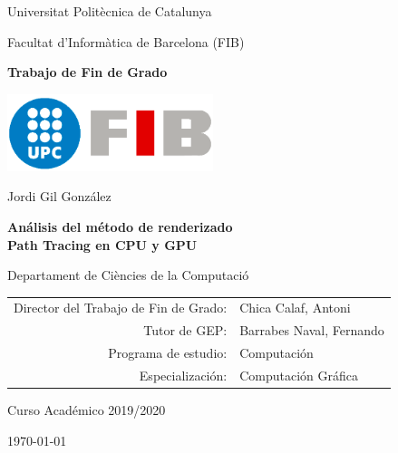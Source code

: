 \newcommand{\HRule}{\rule{\linewidth}{0.5mm}}

\thispagestyle{empty}

\begin{center}

{\large Universitat Politècnica de Catalunya}

\medskip
{\large Facultat d'Informàtica de Barcelona (FIB)}

\vfill
{\bfseries\Large Trabajo de Fin de Grado}

\vfill
\centerline{\mbox{\includegraphics[width=60mm]{media/FIB_UPC.png}}}

\vfill
\vspace{5mm}

{\LARGE Jordi Gil González}

\vspace{15mm}

{\LARGE\bfseries Análisis del método de renderizado \\ Path Tracing en CPU y GPU}

\normalfont \small {}

\vfill

Departament de Ciències de la Computació


\vfill

\begin{tabular}{rl}
Director del Trabajo de Fin de Grado: & Chica Calaf, Antoni \\
\noalign{\vspace{2mm}}
Tutor de GEP: & Barrabes Naval, Fernando \\
\noalign{\vspace{2mm}}
Programa de estudio: & Computación\\
\noalign{\vspace{2mm}}
Especialización: & Computación Gráfica\\
\end{tabular}

\vfill

\large Curso Académico 2019/2020

\large \today

\end{center}

